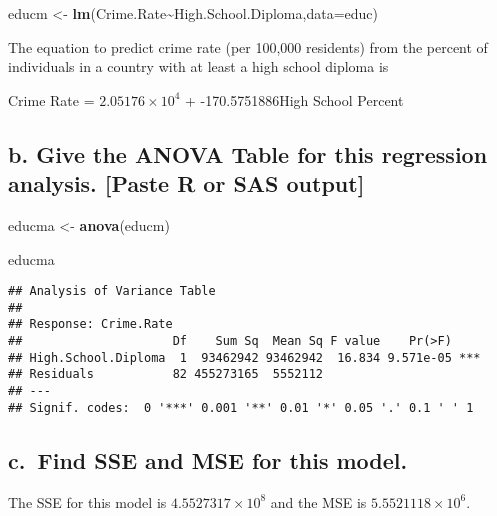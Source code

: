 \documentclass[
]{article}
\newenvironment{Shaded}{\begin{snugshade}}{\end{snugshade}}
\newcommand{\AttributeTok}[1]{\textcolor[rgb]{0.13,0.29,0.53}{#1}}
\newcommand{\FunctionTok}[1]{\textcolor[rgb]{0.13,0.29,0.53}{\textbf{#1}}}
\newcommand{\NormalTok}[1]{#1}
\newcommand{\OtherTok}[1]{\textcolor[rgb]{0.56,0.35,0.01}{#1}}
\newcommand{\SpecialCharTok}[1]{\textcolor[rgb]{0.81,0.36,0.00}{\textbf{#1}}}
\begin{document}
\begin{Shaded}
\begin{Highlighting}[]
\NormalTok{educm }\OtherTok{\textless{}{-}} \FunctionTok{lm}\NormalTok{(Crime.Rate}\SpecialCharTok{\textasciitilde{}}\NormalTok{High.School.Diploma,}\AttributeTok{data=}\NormalTok{educ)}
\end{Highlighting}
\end{Shaded}

The equation to predict crime rate (per 100,000 residents) from the
percent of individuals in a country with at least a high school diploma
is

Crime Rate = \ensuremath{2.05176\times 10^{4}} + -170.5751886High School
Percent

\hypertarget{b.-give-the-anova-table-for-this-regression-analysis.-paste-r-or-sas-output}{%
\subsection{b. Give the ANOVA Table for this regression analysis.
{[}Paste R or SAS
output{]}}\label{b.-give-the-anova-table-for-this-regression-analysis.-paste-r-or-sas-output}}

\begin{Shaded}
\begin{Highlighting}[]
\NormalTok{educma }\OtherTok{\textless{}{-}} \FunctionTok{anova}\NormalTok{(educm)}

\NormalTok{educma}
\end{Highlighting}
\end{Shaded}

\begin{verbatim}
## Analysis of Variance Table
## 
## Response: Crime.Rate
##                     Df    Sum Sq  Mean Sq F value    Pr(>F)    
## High.School.Diploma  1  93462942 93462942  16.834 9.571e-05 ***
## Residuals           82 455273165  5552112                      
## ---
## Signif. codes:  0 '***' 0.001 '**' 0.01 '*' 0.05 '.' 0.1 ' ' 1
\end{verbatim}

\hypertarget{c.-find-sse-and-mse-for-this-model.}{%
\subsection{c.~Find SSE and MSE for this
model.}\label{c.-find-sse-and-mse-for-this-model.}}

The SSE for this model is \ensuremath{4.5527317\times 10^{8}} and the
MSE is \ensuremath{5.5521118\times 10^{6}}.
\end{document}

